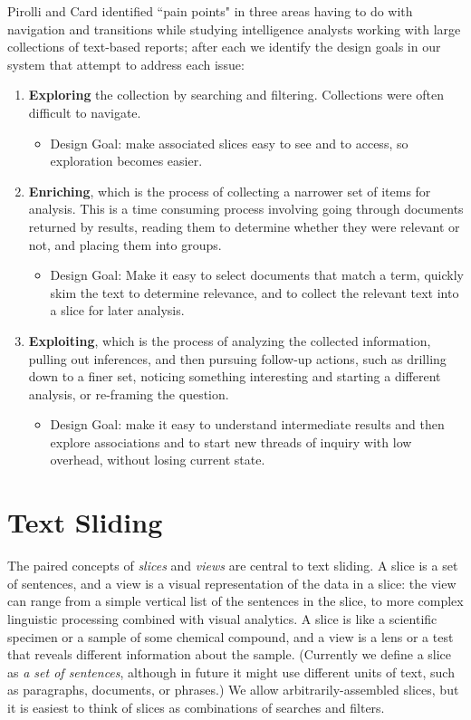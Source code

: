 \documentclass{sig-alternate}
\newcommand{\strong}[1] {\textbf{#1}}
\begin{document}
\begin{enumerate}
Pirolli and Card \cite{pirolli_sensemaking_2005} identified ``pain points" in three areas having to do with navigation and transitions  while studying intelligence analysts working with large collections of text-based reports; after each we identify the design goals in our system that attempt to address each issue:
\begin{enumerate}
\item \strong{Exploring} the collection by searching and filtering. Collections were often difficult to navigate. 
	\begin{itemize}
		\item Design Goal: make associated slices  easy to see and to access, so exploration  becomes easier. 
	\end{itemize}
\item \strong{Enriching}, which is the process of collecting a narrower set of items for analysis. This is a time consuming process involving going through documents returned by results, reading them to determine whether they were relevant or not, and placing them into groups.
	\begin{itemize}
		\item Design Goal: Make it easy to select documents that match a term, quickly skim the text to determine relevance, and to collect the relevant text into a slice for later analysis.
	\end{itemize}
\item \strong{Exploiting}, which is the process of analyzing the collected information, pulling out inferences, and then pursuing  follow-up actions, such as drilling down to a finer set, noticing something interesting and starting a different analysis, or re-framing the question.
	\begin{itemize}
		\item Design Goal: make it easy to understand intermediate results and then explore associations and to start new threads of inquiry with low overhead,  without losing current state.
	\end{itemize}
\end{enumerate}




\section{Text Sliding}

The paired concepts of \emph{slices} and \emph{views} are central to text sliding. A slice is a set of sentences, and a view is a visual representation of the data in a slice: the view can range from a simple vertical list of the sentences in the slice, to more complex linguistic processing combined with visual analytics.  A slice is like a scientific specimen or a sample of some chemical compound,  and a view is a lens or a test that reveals different information about the sample.
(Currently we define a slice as \emph{a set of sentences}, although in future it might use different units of text, such as paragraphs, documents, or phrases.) We allow arbitrarily-assembled slices, but it is easiest to think of slices as combinations of searches and filters.  



\end{enumerate}
\end{document}

